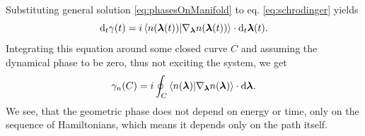 Substituting general solution \ref{eq:phasesOnManifold} to eq. \ref{eq:schrodinger} yields
\begin{equation}
    \mathrm{d}_t \gamma(t)=i\braket{n({\bm\lambda}(t))|\nabla_{\bm\lambda} n({\bm\lambda}(t))}\cdot \mathrm{d}_t {\bm\lambda}(t).
\end{equation}
Integrating this equation around some closed curve $C$ and assuming the dynamical phase to be zero, thus not exciting the system, we get
\begin{equation}
    \gamma_n(C)=i\oint_C\braket{n({\bm\lambda})|\nabla_{\bm\lambda} n({\bm\lambda})}\cdot \mathrm{d} {\bm\lambda}.
    \label{eq:gammaCoint}
\end{equation}
We see, that the geometric phase does not depend on energy or time, only on the sequence of Hamiltonians, which means it depends only on the path itself.




